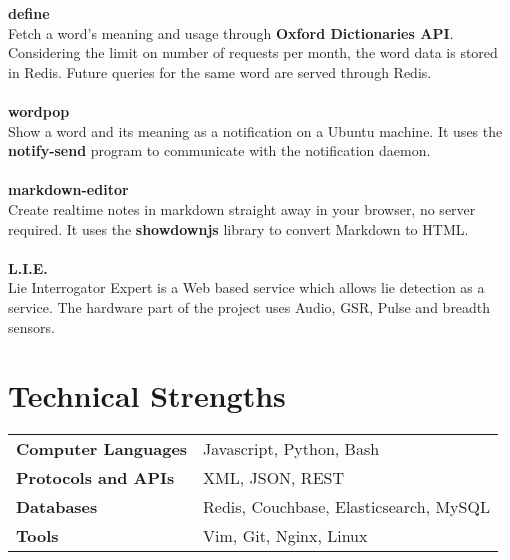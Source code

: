 \documentclass[a4paper,10pt]{article}
\begin{document}
 \textbf{define}\\
 Fetch a word's meaning and usage through \textbf{Oxford Dictionaries API}. Considering the limit on number of requests per month, the word data is stored in Redis. Future queries for the same word are served through Redis.\\
 \\
 \textbf{wordpop}\\
 Show a word and its meaning as a notification on a Ubuntu machine. It uses the \textbf{notify-send} program to communicate with the notification daemon.\\
 \\
 \textbf{markdown-editor}\\
 Create realtime notes in markdown straight away in your browser, no server required. It uses the \textbf{showdownjs} library to convert Markdown to HTML.\\
 \\
 \textbf{L.I.E.}\\
 Lie Interrogator Expert is a Web based service which allows lie detection as a service. The hardware part of the project uses Audio, GSR, Pulse and breadth sensors.
 
\section{Technical Strengths}
\begin{tabular}{ll}
\textbf{Computer Languages} & Javascript, Python, Bash\\
\textbf{Protocols and APIs} & XML, JSON, REST\\
\textbf{Databases} & Redis, Couchbase, Elasticsearch, MySQL \\
\textbf{Tools} & Vim, Git, Nginx, Linux
\end{tabular}
\end{document}
